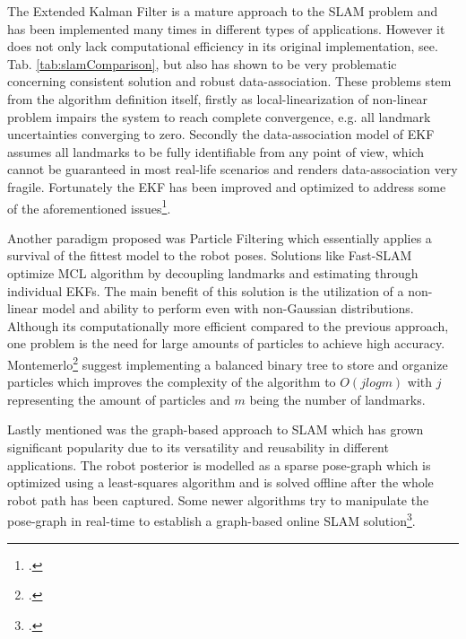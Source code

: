 The Extended Kalman Filter is a mature approach to the SLAM problem and has been implemented many times in different types of applications. However it does not only lack computational efficiency in its original implementation, see. Tab. \ref{tab:slamComparison}, but also has shown to be very problematic concerning consistent solution and robust data-association. 
These problems stem from the algorithm definition itself, firstly as local-linearization of non-linear problem impairs the system to reach complete convergence, e.g. all landmark uncertainties converging to zero. Secondly the data-association model of EKF assumes all landmarks to be fully identifiable from any point of view, which cannot be guaranteed in most real-life scenarios and renders data-association very fragile.
Fortunately the EKF has been improved and optimized to address some of the aforementioned issues\footcite{bailey2006simultaneous}.

Another paradigm proposed was Particle Filtering which essentially applies a survival of the fittest model to the robot poses. Solutions like Fast-SLAM optimize MCL algorithm by decoupling landmarks and estimating through individual EKFs. 
The main benefit of this solution is the utilization of a non-linear model and ability to perform even with non-Gaussian distributions. 
Although its computationally more efficient compared to the previous approach, one problem is the need for large amounts of particles to achieve high accuracy. Montemerlo\footcite{montemerlo2002fastslam} suggest implementing a balanced binary tree to store and organize particles which improves the complexity of the algorithm to $O(j log m)$ with $j$ representing the amount of particles and $m$ being the number of landmarks.

Lastly mentioned was the graph-based approach to SLAM which has grown significant popularity due to its versatility and reusability in different applications. The robot posterior is modelled as a sparse pose-graph which is optimized using a least-squares algorithm and is solved offline after the whole robot path has been captured. Some newer algorithms try to manipulate the pose-graph in real-time to establish a graph-based online SLAM solution\footcite{stachniss2016simultaneous}.


